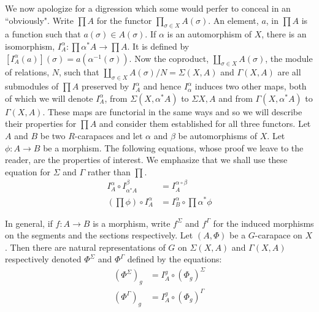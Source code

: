 We now apologize for a digression which some would perfer to conceal in an ``obviously". Write $\prod A$ for the functor $\prod_{\sigma \in X}A(\sigma)$. An element, $a$, in $\prod A$ is a function such that $a(\sigma) \in A(\sigma)$. If $\alpha$ is an automorphism of $X$, there is an isomorphism, $I_{A}^{\alpha} : \prod \alpha^{*}A \rightarrow \prod A$. It is defined by $\left[I_{A}^{\alpha}(a)\right](\sigma) = a(\alpha^{-1}(\sigma))$. Now the coproduct, $\coprod_{\sigma \in X} A(\sigma)$, the module of relations, $N$, such that $\coprod_{\sigma \in X}A(\sigma)/N = \Sigma(X, A)$ and $\Gamma(X, A)$ are all submodules of $\prod A$ preserved by $I_{A}^{\alpha}$ and hence $I_{\alpha}^{\alpha}$ induces two other maps, both of which we will denote $I_{A}^{\alpha}$, from $\Sigma(X, \alpha^{*} A)$ to $\Sigma{X, A}$ and from $\Gamma(X, \alpha^{*} A)$ to $\Gamma(X, A)$. These maps are functorial in the same ways and so we will describe their properties for $\prod A$ and consider them established for all three functors. Let $A$ and $B$ be two $R$-carapaces and let $\alpha$ and $\beta$ be automorphisms of $X$. Let $\phi : A\rightarrow B$ be a morphism. The following equations, whose proof we leave to the reader, are the properties of interest. We emphasize that we shall use these equation for $\Sigma$ and $\Gamma$ rather than $\prod$.
\begin{equation*}
\begin{aligned}\label{chap6-eq-8.3}
I_{A}^{\alpha} \circ I_{\alpha^{*} A}^{\beta} &= I_{A}^{\alpha \circ \beta}\\
\left(\prod \phi\right) \circ I_{A}^{\alpha} &= I_{B}^{\alpha} \circ \prod \alpha^{*}\phi
\end{aligned}\tag{8.3}
\end{equation*}

In general, if $f: A\rightarrow B$ is a morphism, write $f^{\Sigma}$ and $f^{\Gamma}$ for the induced morphisms on the segments and the sections respectively. Let $(A, \Phi)$ be a $G$-carapace on $X$. Then there are natural representations of $G$ on $\Sigma(X, A)$ and $\Gamma(X, A)$ respectively denoted $\Phi^{\Sigma}$ and $\Phi^{\Gamma}$ defined by the equations:
\begin{equation*}
\begin{aligned}\label{chap6-eq-8.4}
\left(\Phi^{\Sigma}\right)_{{g}} &= I_{A}^{{g}} \circ (\Phi_{{g}})^{\Sigma}\\
\left(\Phi^{\Gamma}\right)_{{g}} &= I_{A}^{{g}} \circ (\Phi_{{g}})^{\Gamma}
\end{aligned}\tag{8.4}
\end{equation*}\pageoriginale

